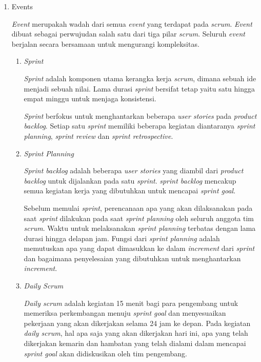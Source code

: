 \begin{enumerate}
\begin{enumerate}
	\end{enumerate}
	
	\item Events
	
	\emph{Event} merupakah wadah dari semua \emph{event} yang terdapat pada \emph{scrum}. \emph{Event} dibuat sebagai perwujudan salah satu dari tiga pilar \emph{scrum}. Seluruh \emph{event} berjalan secara bersamaan untuk mengurangi kompleksitas.
	
		\begin{enumerate}
		\item \emph{Sprint}
		
		\emph{Sprint} adalah komponen utama kerangka kerja \emph{scrum}, dimana sebuah ide menjadi sebuah nilai. Lama durasi \emph{sprint} bersifat tetap yaitu satu hingga empat minggu untuk menjaga konsistensi.
		
		\emph{Sprint} berfokus untuk menghantarkan beberapa \emph{user stories} pada \emph{product backlog}. Setiap satu \emph{sprint} memiliki beberapa kegiatan diantaranya \emph{sprint planning}, \emph{sprint review} dan \emph{sprint retrospective}.
		
		\item \emph{Sprint Planning}
		
		\emph{Sprint backlog} adalah beberapa \emph{user stories} yang diambil dari \emph{product backlog} untuk dijalankan pada satu \emph{sprint}. \emph{sprint backlog} mencakup semua kegiatan kerja yang dibutuhkan untuk mencapai \emph{sprint goal}.
		
		Sebelum memulai \emph{sprint}, perencanaan apa yang akan dilaksanakan pada saat \emph{sprint} dilakukan pada saat \emph{sprint planning} oleh seluruh anggota tim \emph{scrum}. Waktu untuk melaksanakan \emph{sprint planning} terbatas dengan lama durasi hingga delapan jam. Fungsi dari \emph{sprint planning} adalah memutuskan apa yang dapat dimasukkan ke dalam \emph{increment} dari \emph{sprint} dan bagaimana penyelesaian yang dibutuhkan untuk menghantarkan \emph{increment}.
		
		\item \emph{Daily Scrum}
		
		\emph{Daily scrum} adalah kegiatan 15 menit bagi para pengembang untuk memeriksa perkembangan menuju \emph{sprint goal} dan menyesuaikan pekerjaan yang akan dikerjakan selama 24 jam ke depan. Pada kegiatan \emph{daily scrum}, hal apa saja yang akan dikerjakan hari ini, apa yang telah dikerjakan kemarin dan hambatan yang telah dialami dalam mencapai \emph{sprint goal} akan didiskusikan oleh tim pengembang.
		

\end{enumerate}
\end{enumerate}
